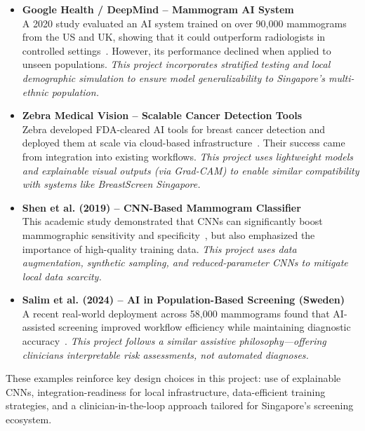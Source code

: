 \documentclass[12pt]{article}
\begin{document}
\begin{itemize}
    \item \textbf{Google Health / DeepMind – Mammogram AI System} \\
    A 2020 study evaluated an AI system trained on over 90,000 mammograms from the US and UK, showing that it could outperform radiologists in controlled settings~\cite{11}. However, its performance declined when applied to unseen populations. \textit{This project incorporates stratified testing and local demographic simulation to ensure model generalizability to Singapore’s multi-ethnic population.}

    \item \textbf{Zebra Medical Vision – Scalable Cancer Detection Tools} \\
    Zebra developed FDA-cleared AI tools for breast cancer detection and deployed them at scale via cloud-based infrastructure~\cite{12}. Their success came from integration into existing workflows. \textit{This project uses lightweight models and explainable visual outputs (via Grad-CAM) to enable similar compatibility with systems like BreastScreen Singapore.}

    \item \textbf{Shen et al. (2019) – CNN-Based Mammogram Classifier} \\
    This academic study demonstrated that CNNs can significantly boost mammographic sensitivity and specificity~\cite{7}, but also emphasized the importance of high-quality training data. \textit{This project uses data augmentation, synthetic sampling, and reduced-parameter CNNs to mitigate local data scarcity.}

    \item \textbf{Salim et al. (2024) – AI in Population-Based Screening (Sweden)} \\
    A recent real-world deployment across 58,000 mammograms found that AI-assisted screening improved workflow efficiency while maintaining diagnostic accuracy~\cite{13}. \textit{This project follows a similar assistive philosophy—offering clinicians interpretable risk assessments, not automated diagnoses.}
\end{itemize}

These examples reinforce key design choices in this project: use of explainable CNNs, integration-readiness for local infrastructure, data-efficient training strategies, and a clinician-in-the-loop approach tailored for Singapore’s screening ecosystem.

\newpage
\end{document}
